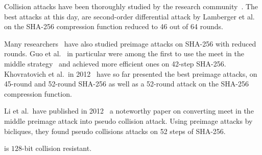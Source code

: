 Collision attacks have been thoroughly studied by the research community~\cite{sanadhya2008new,mendel2011finding}. The best attacks at this day, are second-order differential attack by Lamberger et al.~\cite{lamberger2011higher} on the SHA-256 compression function reduced to 46 out of 64 rounds.

Many researchers~\cite{isobe2009preimage,aoki2009preimages} have also studied preimage attacks on SHA-256 with reduced rounds. Guo et al.~\cite{guo2010advanced} in particular were among the first to use the meet in the middle strategy~\cite{aoki2009meet} and achieved more efficient ones on 42-step SHA-256. Khovratovich et al.~in 2012~\cite{khovratovich2012bicliques} have so far presented the best preimage attacks, on 45-round and 52-round SHA-256 as well as a 52-round attack on the SHA-256 compression function.

Li et al.~have published in 2012~\cite{li2012converting} a noteworthy paper on converting meet in the middle preimage attack into pseudo collision attack. Using preimage attacks by bicliques, they found pseudo collisions  attacks on 52 steps of SHA-256.

\begin{claim}
	 is $128$-bit collision resistant.
\end{claim}
